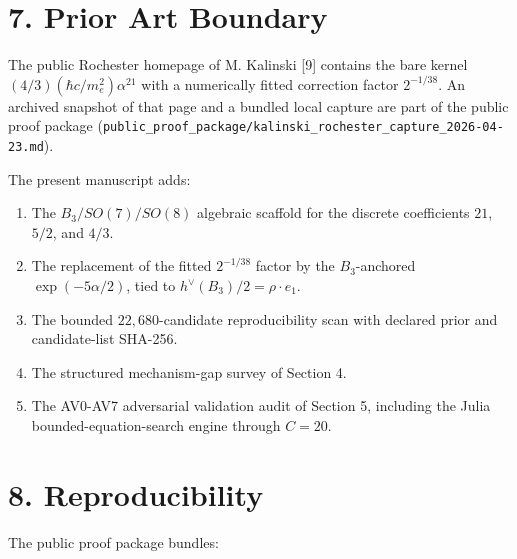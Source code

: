 \documentclass[
  11pt,
  letterpaper,
  twocolumn,
]{article}
\providecommand{\tightlist}{%
  \setlength{\itemsep}{0pt}\setlength{\parskip}{0pt}}
\providecommand{\tightlist}{\setlength{\itemsep}{0pt}\setlength{\parskip}{0pt}}
\begin{document}
\section{7. Prior Art Boundary}\label{prior-art-boundary}

The public Rochester homepage of M. Kalinski {[}9{]} contains the bare
kernel \((4/3)(\hbar c/m_e^2)\alpha^{21}\) with a numerically fitted
correction factor \(2^{-1/38}\). An archived snapshot of that page and a
bundled local capture are part of the public proof package
(\texttt{public\_proof\_package/\allowbreak kalinski\_rochester\_capture\_2026-04-23.md}).

The present manuscript adds:

\begin{enumerate}
\def\labelenumi{\arabic{enumi}.}
\tightlist
\item
  The \(B_3/SO(7)/SO(8)\) algebraic scaffold for the discrete
  coefficients \(21\), \(5/2\), and \(4/3\).
\item
  The replacement of the fitted \(2^{-1/38}\) factor by the
  \(B_3\)-anchored \(\exp(-5\alpha/2)\), tied to
  \(h^\vee(B_3)/2 = \rho\!\cdot\!e_1\).
\item
  The bounded \(22{,}680\)-candidate reproducibility scan with declared
  prior and candidate-list SHA-256.
\item
  The structured mechanism-gap survey of Section 4.
\item
  The AV0-AV7 adversarial validation audit of Section 5, including the
  Julia bounded-equation-search engine through \(C\!=\!20\).
\end{enumerate}

\section{8. Reproducibility}\label{reproducibility}

The public proof package bundles:
\end{document}
